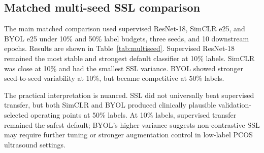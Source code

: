\documentclass[pdflatex,sn-mathphys-num]{sn-jnl}
\theoremstyle{thmstyleone}
\theoremstyle{thmstyletwo}
\theoremstyle{thmstylethree}
\begin{document}
\subsection{Matched multi-seed SSL comparison}\label{subsec:ssl_results}

The main matched comparison used supervised ResNet-18, SimCLR e25, and BYOL e25 under 10\% and 50\% label budgets, three seeds, and 10 downstream epochs. Results are shown in Table~\ref{tab:multiseed}. Supervised ResNet-18 remained the most stable and strongest default classifier at 10\% labels. SimCLR was close at 10\% and had the smallest SSL variance. BYOL showed stronger seed-to-seed variability at 10\%, but became competitive at 50\% labels.

\begin{table}[t]
\caption{Matched three-seed, 10-downstream-epoch comparison. Tuned accuracy is computed at a validation-selected balanced-accuracy threshold and evaluated once on the test set. Values are mean +/- standard deviation over seeds 42, 7, and 123.}\label{tab:multiseed}
\end{table}

The practical interpretation is nuanced. SSL did not universally beat supervised transfer, but both SimCLR and BYOL produced clinically plausible validation-selected operating points at 50\% labels. At 10\% labels, supervised transfer remained the safest default; BYOL's higher variance suggests non-contrastive SSL may require further tuning or stronger augmentation control in low-label PCOS ultrasound settings.
\end{document}
